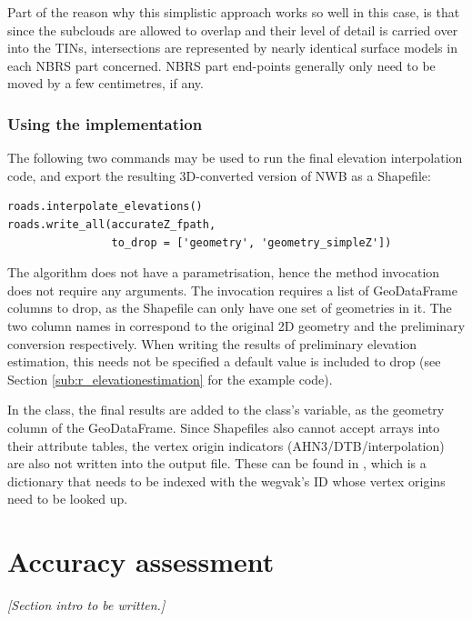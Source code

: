Part of the reason why this simplistic approach works so well in this case, is that since the subclouds are allowed to overlap and their level of detail is carried over into the TINs, intersections are represented by nearly identical surface models in each NBRS part concerned. NBRS part end-points generally only need to be moved by a few centimetres, if any.

\subsubsection{Using the implementation}

The following two commands may be used to run the final elevation interpolation code, and export the resulting 3D-converted version of NWB as a Shapefile:

\begin{lstlisting}
roads.interpolate_elevations()
roads.write_all(accurateZ_fpath,
                to_drop = ['geometry', 'geometry_simpleZ'])
\end{lstlisting}

The algorithm does not have a parametrisation, hence the method invocation does not require any arguments. The  invocation requires a list of GeoDataFrame columns to drop, as the Shapefile can only have one set of geometries in it. The two column names in  correspond to the original 2D geometry and the preliminary conversion respectively. When writing the results of preliminary elevation estimation, this needs not be specified a default value is included to drop  (see Section \ref{sub:r_elevationestimation} for the example code).

In the  class, the final results are added to the class's  variable, as the  geometry column of the GeoDataFrame. Since Shapefiles also cannot accept arrays into their attribute tables, the vertex origin indicators (AHN3/DTB/interpolation) are also not written into the output file. These can be found in , which is a dictionary that needs to be indexed with the wegvak's ID whose vertex origins need to be looked up.

\section{Accuracy assessment}
\label{sec:accuracy}

\textit{[Section intro to be written.]}


